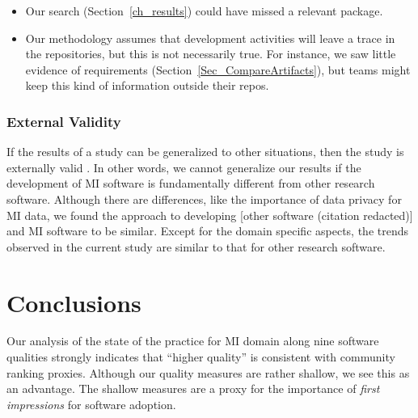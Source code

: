 \documentclass[final, 12pt, 3p, times]{elsarticle}
\begin{document}
\begin{itemize}
\item Our search (Section~\ref{ch_results}) could
have missed a relevant package.
\item Our methodology assumes that development activities
will leave a trace in the repositories, but this is not necessarily true. For
instance, we saw little evidence of requirements
(Section~\ref{Sec_CompareArtifacts}), but teams might keep this kind of
information outside their repos.
\end{itemize}

\subsubsection{External Validity}

If the results of a study can be generalized to other situations, then the
study is externally valid \cite{RunesonAndHost2009}.  In other words, we cannot
generalize our results if the development of MI software is fundamentally
different from other research software.  Although there are differences, like
the importance of data privacy for MI data, we found the approach to developing
[other software (citation redacted)]
and MI software to be similar.  Except for
the domain specific aspects, the trends observed in the current study are
similar to that for other research software.

\section{Conclusions} \label{ch_conclusions}

Our analysis of the state of the practice for MI domain along nine software
qualities strongly indicates that ``higher quality'' is consistent with
community ranking proxies. Although our quality measures are rather shallow, we
see this as an advantage. The shallow measures are a proxy for the importance of
\emph{first impressions} for software adoption.
\end{document}

